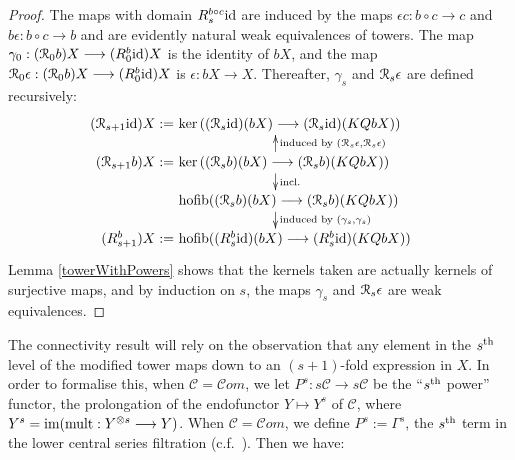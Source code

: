 \documentclass[11pt]{amsart} \renewcommand{\baselinestretch}{1.2}
\theoremstyle{plain}
\theoremstyle{definition}
\renewcommand{\ker}{\mathrm{ker}\,}
\DeclareMathOperator*{\hofib}{hofib}
\renewcommand{\to}{\longrightarrow}
\newcommand{\scrC}{\mathscr{C}}
\newcommand{\calR}{\mathcal{R}}
\newcommand{\calc}{\mathcal{C}}
\newcommand{\Id}{\mathrm{id}}
\newcommand{\algs}{{\scrC\!\textit{om}}}
\newcommand{\algcat}{{\calc}}%
\renewcommand{\mapsto}{\longmapsto}
\newcommand{\caldup}[1]{\calR_{\smash{#1}}}
\newcommand{\plainD}{R}
\newcommand{\barConstructionMightAbbreviate}{b}
\begin{document}
\begin{Bousfield-Kan spectral sequence}
\begin{proof}
The maps with domain $\plainD_{\smash{s}}^{\smash{\barConstructionMightAbbreviate \circ c}}\Id $ are induced by the maps $\epsilon c:\barConstructionMightAbbreviate \circ c\to c$ and $\barConstructionMightAbbreviate \epsilon:\barConstructionMightAbbreviate \circ c\to \barConstructionMightAbbreviate $ and are evidently natural weak equivalences of towers. The map $\gamma_0:(\caldup{0}\barConstructionMightAbbreviate )X\to (\plainD_{\smash{0}}^{\smash{\barConstructionMightAbbreviate }}\Id )X$ is the identity of $\barConstructionMightAbbreviate X$, and the map $\caldup{0}\epsilon:(\caldup{0}\barConstructionMightAbbreviate )X\to (\plainD_{\smash{0}}^{\smash{\barConstructionMightAbbreviate }}\Id )X$ is $\epsilon:\barConstructionMightAbbreviate X\to X$. Thereafter, $\gamma_s$ and $\caldup{s}\epsilon$ are defined recursively:
\[\qquad \quad \xymatrix@R=4mm{
\makebox[0cm][r]{$(\caldup{s+1}\Id )X:=\,$}\makebox[5cm][l]{$\,\ker((\caldup{s}\Id )(\barConstructionMightAbbreviate X)\to (\caldup{s}\Id )(KQ\barConstructionMightAbbreviate X))$}\\
\makebox[0cm][r]{$(\caldup{s+1}\barConstructionMightAbbreviate )X:=\,$}\makebox[5cm][l]{$\,\ker((\caldup{s}\barConstructionMightAbbreviate )(\barConstructionMightAbbreviate X)\to (\caldup{s}\barConstructionMightAbbreviate )(KQ\barConstructionMightAbbreviate X))$}\ar[d]^-{\textup{incl.}}_-{}%
\ar[u]_-{\textup{induced by }(\caldup{s}\epsilon,\caldup{s}\epsilon)}^-{}%
\\%
\makebox[5cm][l]{$\,\hofib((\caldup{s}\barConstructionMightAbbreviate )(\barConstructionMightAbbreviate X)\to(\caldup{s}\barConstructionMightAbbreviate )(KQ\barConstructionMightAbbreviate X))$}\ar[d]^-{\textup{induced by }(\gamma_{s},\gamma_{s})}_-{}%
\\%
\makebox[0cm][r]{$(\plainD_{\smash{s+1}}^{\smash{\barConstructionMightAbbreviate }})X:=\,$}\makebox[5cm][l]{$\,\hofib((\plainD_{\smash{s}}^{\smash{\barConstructionMightAbbreviate }}\Id )(\barConstructionMightAbbreviate X)\to (\plainD_{\smash{s}}^{\smash{\barConstructionMightAbbreviate }}\Id )(KQ\barConstructionMightAbbreviate X))$}%
}\]
\noindent Lemma \ref{towerWithPowers} shows that the kernels taken are actually kernels of surjective maps, and by induction on $s$, the maps $\gamma_s$ and $\caldup{s}\epsilon$ are weak equivalences.
\end{proof}
The connectivity result will rely on the observation that any element in the $s^\textup{th}$ level of the modified tower maps down to an $(s+1)$-fold expression in $X$. In order to formalise this, when $\algcat=\algs$, we let $P^s:s\algcat\to s\algcat$ be the ``$s^\textup{th}$ power'' functor, the prolongation of the endofunctor $Y\mapsto Y^s$ of $\algcat$, where $Y^s=\textup{im}(\textup{mult}:Y^{\otimes s}\to Y)$. When $\algcat=\algs$, we define $P^s:=\Gamma^s$, the $s^\textup{th}$ term in the lower central series filtration (c.f.\ \cite{6Author.pdf}). Then we have:

\end{Bousfield-Kan spectral sequence}
\end{document}
